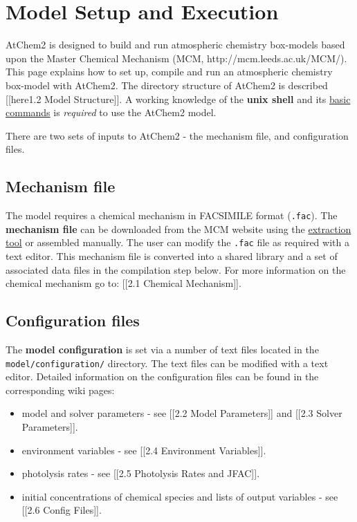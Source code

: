 \section{Model Setup and Execution} \label{sec:setup}

AtChem2 is designed to build and run atmospheric chemistry box-models
based upon the Master Chemical Mechanism (MCM,
http://mcm.leeds.ac.uk/MCM/). This page explains how to set up, compile
and run an atmospheric chemistry box-model with AtChem2. The directory
structure of AtChem2 is described {[}{[}here\textbar{}1.2 Model
Structure{]}{]}. A working knowledge of the \textbf{unix shell} and its
\href{https://swcarpentry.github.io/shell-novice/reference/}{basic
commands} is \emph{required} to use the AtChem2 model.

There are two sets of inputs to AtChem2 - the mechanism file, and
configuration files.

\hypertarget{mechanism-file}{%
\subsection{Mechanism file}\label{mechanism-file}}

The model requires a chemical mechanism in FACSIMILE format
(\texttt{.fac}). The \textbf{mechanism file} can be downloaded from the
MCM website using the
\href{http://mcm.leeds.ac.uk/MCMv3.3.1/extract.htt}{extraction tool} or
assembled manually. The user can modify the \texttt{.fac} file as
required with a text editor. This mechanism file is converted into a
shared library and a set of associated data files in the compilation
step below. For more information on the chemical mechanism go to:
{[}{[}2.1 Chemical Mechanism{]}{]}.

\hypertarget{configuration-files}{%
\subsection{Configuration files}\label{configuration-files}}

The \textbf{model configuration} is set via a number of text files
located in the \texttt{model/configuration/} directory. The text files
can be modified with a text editor. Detailed information on the
configuration files can be found in the corresponding wiki pages:

\begin{itemize}
\item
  model and solver parameters - see {[}{[}2.2 Model Parameters{]}{]} and
  {[}{[}2.3 Solver Parameters{]}{]}.
\item
  environment variables - see {[}{[}2.4 Environment Variables{]}{]}.
\item
  photolysis rates - see {[}{[}2.5 Photolysis Rates and JFAC{]}{]}.
\item
  initial concentrations of chemical species and lists of output
  variables - see {[}{[}2.6 Config Files{]}{]}.
\end{itemize}

